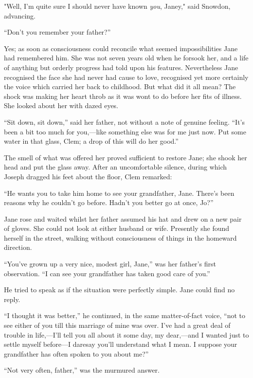 "Well, I'm quite sure I should never have known \emph{you}, Janey," said
Snowdon, advancing.

``Don't you remember your father?''

{}Yes; as soon as consciousness could reconcile what seemed
impossibilities Jane had remembered him. She was not seven years old
when he forsook her, and a life of anything but orderly progress had
told upon his features. Nevertheless Jane recognised the face she had
never had cause to love, recognised yet more certainly the voice which
carried her back to childhood. But what did it all mean? The shock was
making her heart throb as it was wont to do before her fits of illness.
She looked about her with dazed eyes.

``Sit down, sit down,'' said her father, not without a note of genuine
feeling. ``It's been a bit too much for you,---like something else was
for me just now. Put some water in that glass, Clem; a drop of this will
do her good.''

The smell of what was offered her proved sufficient to restore Jane; she
shook her head and put the glass away. After an uncomfortable silence,
during which Joseph dragged his feet about the floor, Clem remarked:

{}``He wants you to take him home to see your grandfather, Jane. There's
been reasons why he couldn't go before. Hadn't you better go at once,
Jo?''

Jane rose and waited whilst her father assumed his hat and drew on a new
pair of gloves. She could not look at either husband or wife. Presently
she found herself in the street, walking without consciousness of things
in the homeward direction.

``You've grown up a very nice, modest girl, Jane,'' was her father's
first observation. ``I can see your grandfather has taken good care of
you.''

He tried to speak as if the situation were perfectly simple. Jane could
find no reply.

``I thought it was better,'' he continued, in the same matter-of-fact
voice, ``not to see either of you till this marriage of mine was over.
I've had a great deal of trouble in life,---I'll tell you all about it
some day, my dear,---and I wanted just to settle myself before---I
daresay you'll understand what I mean. I {}suppose your grandfather has
often spoken to you about me?''

``Not very often, father,'' was the murmured answer.


